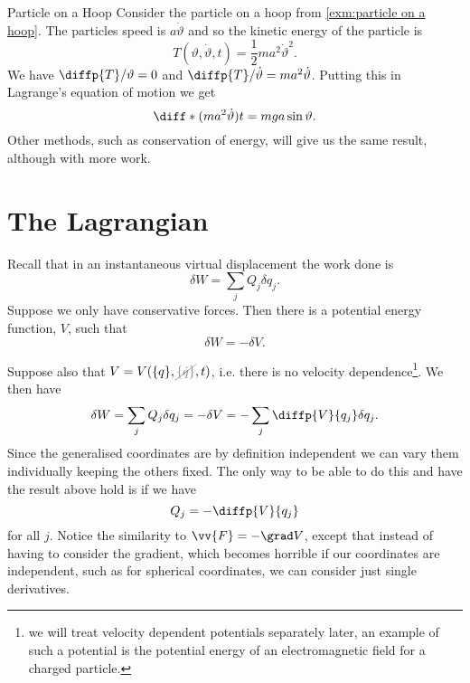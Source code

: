 \documentclass[fleqn]{NotesClass}
\newcommand*{\nodependence}[1]{\textcolor{gray}{\cancel{#1}}}
\begin{document}
    \begin{exm}{Particle on a Hoop}{}
        Consider the particle on a hoop from \cref{exm:particle on a hoop}.
        The particles speed is \(a\dot{\vartheta}\) and so the kinetic energy of the particle is
        \begin{equation}
            T(\vartheta, \dot{\vartheta}, t) = \frac{1}{2}ma^2 \dot{\vartheta}^2.
        \end{equation}
        We have \(\diffp{T}/{\vartheta} = 0\) and \(\diffp{T}/{\dot{\vartheta}} = ma^2\dot{\vartheta}\).
        Putting this in Lagrange's equation of motion we get
        \begin{equation}
            \diff*{(ma^2\dot{\vartheta})}{t} = mga\sin\vartheta.
        \end{equation}
        Other methods, such as conservation of energy, will give us the same result, although with more work.
    \end{exm}
    
    \section{The Lagrangian}
    Recall that in an instantaneous virtual displacement the work done is
    \begin{equation}
        \delta W = \sum_j Q_j \delta q_j.
    \end{equation}
    Suppose we only have conservative forces.
    Then there is a potential energy function, \(V\), such that
    \begin{equation}
        \delta W = -\delta V.
    \end{equation}
    
    Suppose also that \(V = V(\{q\}, \nodependence{\{\dot{q}\}}, t)\), i.e. there is no velocity dependence\footnote{we will treat velocity dependent potentials separately later, an example of such a potential is the potential energy of an electromagnetic field for a charged particle.}.
    We then have
    \begin{equation}
        \delta W = \sum_j Q_j \delta q_j = -\delta V = -\sum_j \diffp{V}{q_j}\delta q_j.
    \end{equation}
    Since the generalised coordinates are by definition independent we can vary them individually keeping the others fixed.
    The only way to be able to do this and have the result above hold is if we have
    \begin{equation}
        Q_j = -\diffp{V}{q_j}
    \end{equation}
    for all \(j\).
    Notice the similarity to \(\vv{F} = -\grad V\), except that instead of having to consider the gradient, which becomes horrible if our coordinates are independent, such as for spherical coordinates, we can consider just single derivatives.
    
\end{document}
